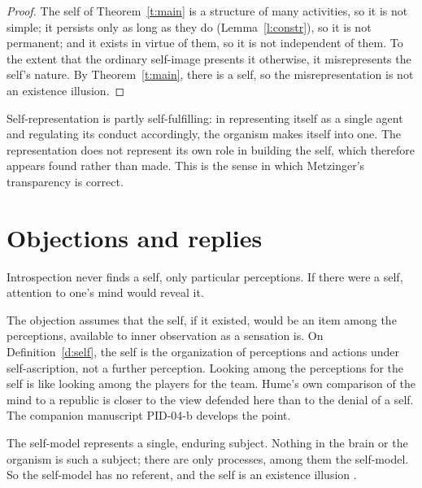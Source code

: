 \documentclass{situationist-preprint}
\begin{document}
\begin{proof}
The self of Theorem~\ref{t:main} is a structure of many activities, so it is not simple; it persists only as long as they do (Lemma~\ref{l:constr}), so it is not permanent; and it exists in virtue of them, so it is not independent of them. To the extent that the ordinary self-image presents it otherwise, it misrepresents the self's nature. By Theorem~\ref{t:main}, there is a self, so the misrepresentation is not an existence illusion.
\end{proof}

Self-representation is partly self-fulfilling: in representing itself as a single agent and regulating its conduct accordingly, the organism makes itself into one. The representation does not represent its own role in building the self, which therefore appears found rather than made. This is the sense in which Metzinger's transparency is correct.

\section{Objections and replies}\label{s:obj}

\begin{objection}[Hume]
Introspection never finds a self, only particular perceptions. If there were a self, attention to one's mind would reveal it.
\end{objection}

\begin{reply}
The objection assumes that the self, if it existed, would be an item among the perceptions, available to inner observation as a sensation is. On Definition~\ref{d:self}, the self is the organization of perceptions and actions under self-ascription, not a further perception. Looking among the perceptions for the self is like looking among the players for the team. Hume's own comparison of the mind to a republic \citep[1.4.6]{Hume1739} is closer to the view defended here than to the denial of a self. The companion manuscript PID-04-b develops the point.
\end{reply}

\begin{objection}
The self-model represents a single, enduring subject. Nothing in the brain or the organism is such a subject; there are only processes, among them the self-model. So the self-model has no referent, and the self is an existence illusion \citep{Metzinger2003}.
\end{objection}
\end{document}
